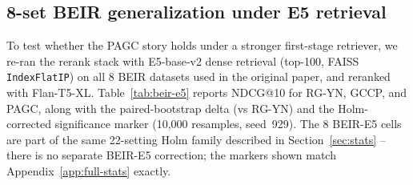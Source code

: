 \documentclass[sigconf]{acmart}
\begin{document}
\subsection{8-set BEIR generalization under E5 retrieval}
\label{sec:beir-e5}

To test whether the PAGC story holds under a stronger first-stage
retriever, we re-ran the rerank stack with E5-base-v2 dense retrieval
(top-100, FAISS~\cite{johnson2019faiss} \texttt{IndexFlatIP}) on all 8 BEIR datasets used in
the original paper, and reranked with Flan-T5-XL.
Table~\ref{tab:beir-e5} reports NDCG@10 for RG-YN, GCCP, and PAGC,
along with the paired-bootstrap delta (vs RG-YN) and the
Holm-corrected significance marker (10{,}000 resamples, seed~929).
The 8 BEIR-E5 cells are part of the same 22-setting Holm family
described in Section~\ref{sec:stats} -- there is no separate BEIR-E5
correction; the markers shown match Appendix~\ref{app:full-stats}
exactly.
\end{document}

